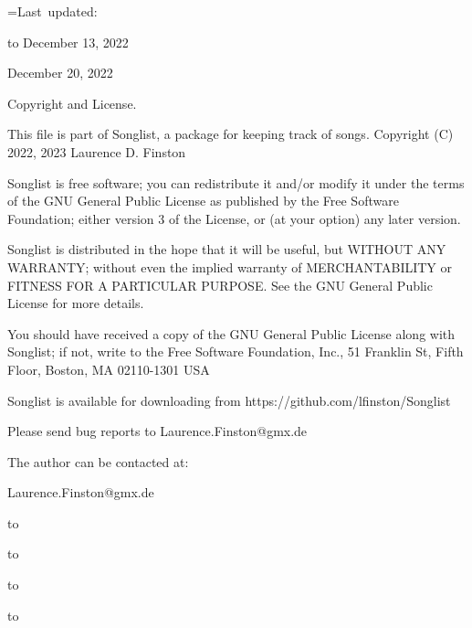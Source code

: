 \small
{}=\hbox{Last updated:\quad}

\leavevmode\hbox to December 13, 2022

\leavevmode{} December 20, 2022 %

Copyright and License.

This file is part of Songlist, a package for keeping track of songs.
Copyright (C) 2022, 2023 Laurence D. Finston

Songlist is free software; you can redistribute it and/or modify 
it under the terms of the GNU General Public License as published by 
the Free Software Foundation; either version 3 of the License, or 
(at your option) any later version.  

Songlist is distributed in the hope that it will be useful, 
but WITHOUT ANY WARRANTY; without even the implied warranty of 
MERCHANTABILITY or FITNESS FOR A PARTICULAR PURPOSE.  See the 
GNU General Public License for more details.  

You should have received a copy of the GNU General Public License 
along with Songlist; if not, write to the Free Software 
Foundation, Inc., 51 Franklin St, Fifth Floor, Boston, MA  02110-1301  USA 

Songlist is available for downloading from 
https://github.com/lfinston/Songlist

Please send bug reports to Laurence.Finston@gmx.de

The author can be contacted at: 

Laurence.Finston@gmx.de
\endgroup


\vbox to 
\vfil\eject



\vbox to 
\vfil\eject


\vbox to 
\vfil\eject


\vbox to 
\vfil\eject


\bye





